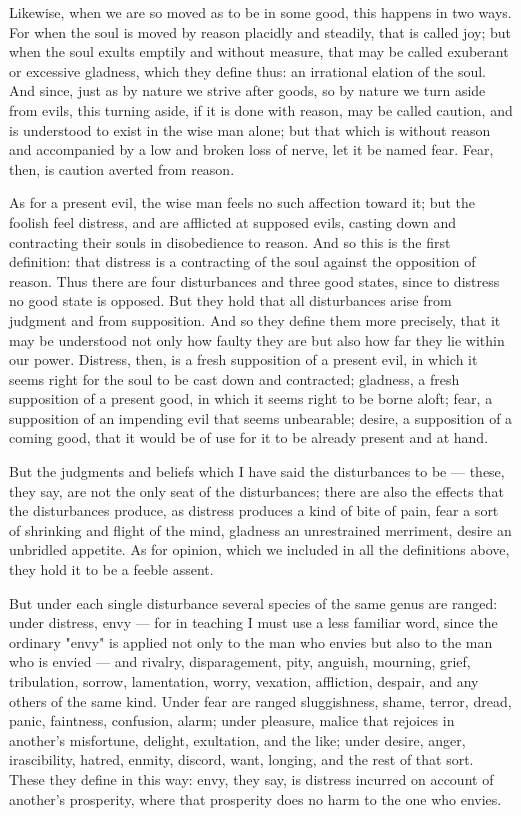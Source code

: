  Likewise, when we are so moved as to be in some good, this happens in two ways. For when the soul is moved by reason placidly and steadily, that is called joy; but when the soul exults emptily and without measure, that may be called exuberant or excessive gladness, which they define thus: an irrational elation of the soul. And since, just as by nature we strive after goods, so by nature we turn aside from evils, this turning aside, if it is done with reason, may be called caution, and is understood to exist in the wise man alone; but that which is without reason and accompanied by a low and broken loss of nerve, let it be named fear. Fear, then, is caution averted from reason.

 As for a present evil, the wise man feels no such affection toward it; but the foolish feel distress, and are afflicted at supposed evils, casting down and contracting their souls in disobedience to reason. And so this is the first definition: that distress is a contracting of the soul against the opposition of reason. Thus there are four disturbances and three good states, since to distress no good state is opposed. But they hold that all disturbances arise from judgment and from supposition. And so they define them more precisely, that it may be understood not only how faulty they are but also how far they lie within our power. Distress, then, is a fresh supposition of a present evil, in which it seems right for the soul to be cast down and contracted; gladness, a fresh supposition of a present good, in which it seems right to be borne aloft; fear, a supposition of an impending evil that seems unbearable; desire, a supposition of a coming good, that it would be of use for it to be already present and at hand.

 But the judgments and beliefs which I have said the disturbances to be — these, they say, are not the only seat of the disturbances; there are also the effects that the disturbances produce, as distress produces a kind of bite of pain, fear a sort of shrinking and flight of the mind, gladness an unrestrained merriment, desire an unbridled appetite. As for opinion, which we included in all the definitions above, they hold it to be a feeble assent.

 But under each single disturbance several species of the same genus are ranged: under distress, envy — for in teaching I must use a less familiar word, since the ordinary "envy" is applied not only to the man who envies but also to the man who is envied — and rivalry, disparagement, pity, anguish, mourning, grief, tribulation, sorrow, lamentation, worry, vexation, affliction, despair, and any others of the same kind. Under fear are ranged sluggishness, shame, terror, dread, panic, faintness, confusion, alarm; under pleasure, malice that rejoices in another's misfortune, delight, exultation, and the like; under desire, anger, irascibility, hatred, enmity, discord, want, longing, and the rest of that sort. These they define in this way: envy, they say, is distress incurred on account of another's prosperity, where that prosperity does no harm to the one who envies.

